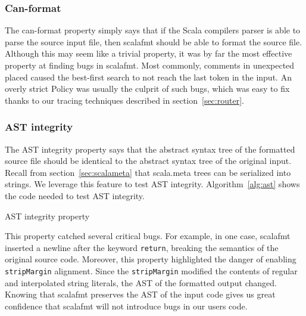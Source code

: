 \subsubsection{Can-format}
The can-format property simply says that if the Scala compilers parser is able to parse the source input file, then scalafmt should be able to format the source file.
Although this may seem like a trivial property, it was by far the most effective property at finding bugs in scalafmt.
Most commonly, comments in unexpected placed caused the best-first search to not reach the last token in the input.
An overly strict Policy was usually the culprit of such bugs, which was easy to fix thanks to our tracing techniques described in section~\ref{sec:router}.

\subsubsection{AST integrity}
The AST integrity property says that the abstract syntax tree of the formatted source file should be identical to the abstract syntax tree of the original input.
Recall from section~\ref{sec:scalameta} that scala.meta trees can be serialized into strings.
We leverage this feature to test AST integrity.
Algorithm~\ref{alg:ast} shows the code needed to test AST integrity.
\begin{algorithm}
  \caption{AST integrity property}\label{alg:ast}
  
\end{algorithm}
This property catched several critical bugs.
For example, in one case, scalafmt inserted a newline after the keyword \texttt{return}, breaking the semantics of the original source code.
Moreover, this property highlighted the danger of enabling \texttt{stripMargin} alignment.
Since the \texttt{stripMargin} modified the contents of regular and interpolated string literals,
the AST of the formatted output changed.
Knowing that scalafmt preserves the AST of the input code gives us great confidence that scalafmt will not introduce bugs in our users code.


